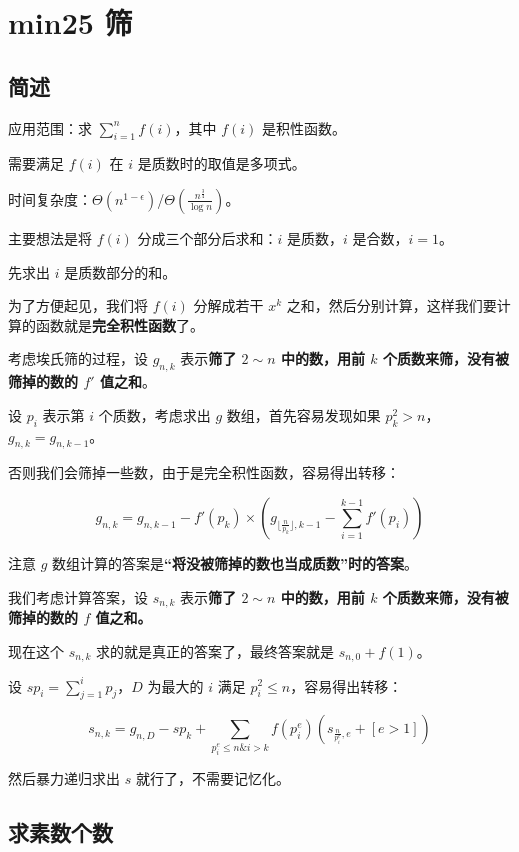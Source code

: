 \section{min25 筛}

\subsection{简述}

应用范围：求 $\sum_{i=1}^n f(i)$，其中 $f(i)$ 是积性函数。

需要满足 $f(i)$ 在 $i$ 是质数时的取值是多项式。

时间复杂度：$\Theta(n^{1-\epsilon})$/$\Theta(\frac{n^{\frac{3}{4}}}{\log n})$。

主要想法是将 $f(i)$ 分成三个部分后求和：$i$ 是质数，$i$ 是合数，$i=1$。

先求出 $i$ 是质数部分的和。

为了方便起见，我们将 $f(i)$ 分解成若干 $x^k$ 之和，然后分别计算，这样我们要计算的函数就是\textbf{完全积性函数}了。

考虑埃氏筛的过程，设 $g_{n,k}$ 表示\textbf{筛了 $2 \sim n$ 中的数，用前 $k$ 个质数来筛，没有被筛掉的数的 $f'$ 值之和}。

设 $p_i$ 表示第 $i$ 个质数，考虑求出 $g$ 数组，首先容易发现如果 $p_k^2 > n$，$g_{n,k}=g_{n,k-1}$。

否则我们会筛掉一些数，由于是完全积性函数，容易得出转移：

$$g_{n,k}=g_{n,k-1}-f'(p_k) \times (g_{\lfloor \frac{n}{p_k} \rfloor,k-1}-\sum_{i=1}^{k-1}f'(p_i))$$

注意 $g$ 数组计算的答案是\textbf{“将没被筛掉的数也当成质数”时的答案}。

我们考虑计算答案，设 $s_{n,k}$ 表示\textbf{筛了 $2 \sim n$ 中的数，用前 $k$ 个质数来筛，没有被筛掉的数的 $f$ 值之和。}

现在这个 $s_{n,k}$ 求的就是真正的答案了，最终答案就是 $s_{n,0}+f(1)$。

设 $sp_i=\sum_{j=1}^i p_j$，$D$ 为最大的 $i$ 满足 $p_i^2 \le n$，容易得出转移：

$$s_{n,k}=g_{n,D}-sp_{k}+\sum_{p_i^e \le n \& i>k} f({p_i^e})(s_{\frac{n}{p_i^e},e}+[e>1])$$

然后暴力递归求出 $s$ 就行了，不需要记忆化。

\subsection{求素数个数}

